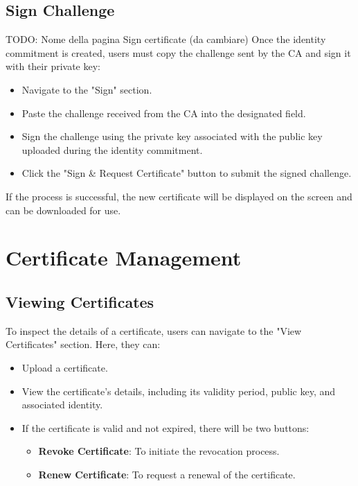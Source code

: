 \subsection{Sign Challenge} {\color{red}TODO: Nome della pagina Sign certificate (da cambiare)}
Once the identity commitment is created, users must copy the challenge sent by the CA and sign it with their private key:
\begin{itemize}
    \item Navigate to the "Sign" section.
    \item Paste the challenge received from the CA into the designated field.
    \item Sign the challenge using the private key associated with the public key uploaded during the identity commitment.
    \item Click the "Sign \& Request Certificate" button to submit the signed challenge.
\end{itemize}
If the process is successful, the new certificate will be displayed on the screen and can be downloaded for use.

\section{Certificate Management}

\subsection{Viewing Certificates}
To inspect the details of a certificate, users can navigate to the "View Certificates" section. Here, they can:
\begin{itemize}
    \item Upload a certificate.
    \item View the certificate's details, including its validity period, public key, and associated identity.
    \item If the certificate is valid and not expired, there will be two buttons:
        \begin{itemize}
            \item \textbf{Revoke Certificate}: To initiate the revocation process.
            \item \textbf{Renew Certificate}: To request a renewal of the certificate.
        \end{itemize}
\end{itemize}

